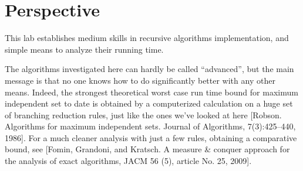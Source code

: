 \documentclass{tufte-handout}
\begin{document}
\newpage
\section{ Perspective}

This lab establishes medium skills in recursive algorithms implementation,
and simple means to analyze their running time.

\bigskip

The algorithms investigated here can hardly be called ``advanced'', but the main message 
is that no one knows how to do significantly better with any other means.
Indeed, the strongest theoretical worst case run time bound for maximum independent set to date
is obtained by a computerized calculation on a huge set of branching reduction rules, just like the ones we've looked at here [Robson. Algorithms for maximum independent sets. Journal of Algorithms, 7(3):425--440, 1986]. For a much cleaner analysis with just a few rules, obtaining a comparative bound, see [Fomin, Grandoni, and Kratsch. A measure \& conquer approach for the analysis of exact algorithms, JACM 56 (5), article No. 25, 2009].
\end{document}

